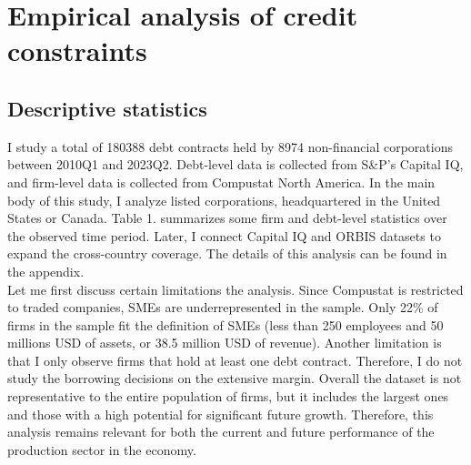 \documentclass[12pt]{article}
\begin{document}
\section{Empirical analysis of credit constraints \label{sec:quantitative analysis}}
\subsection{Descriptive statistics \label{sec:descriptive stats}}

I study a total of 180388 debt contracts held by 8974 non-financial corporations between 2010Q1 and 2023Q2. Debt-level data is collected from S\&P's Capital IQ, and firm-level data is collected from Compustat North America. In the main body of this study, I analyze listed corporations, headquartered in the United States or Canada. Table 1. summarizes some firm and debt-level statistics over the observed time period. Later, I connect Capital IQ and ORBIS datasets to expand the cross-country coverage. The details of this analysis can be found in the appendix. \vspace{3mm} \\ 
Let me first discuss certain limitations the analysis. Since Compustat is restricted to traded companies, SMEs are underrepresented in the sample. Only 22\% of firms in the sample fit the definition of SMEs (less than 250 employees and 50 millions USD of assets, or 38.5 million USD of revenue). Another limitation is that I only observe firms that hold at least one debt contract. Therefore, I do not study the borrowing decisions on the extensive margin. Overall the dataset is not representative to the entire population of firms, but it includes the largest ones and those with a high potential for significant future growth.  Therefore, this analysis remains relevant for both the current and future performance of the production sector in the economy.
\end{document}
